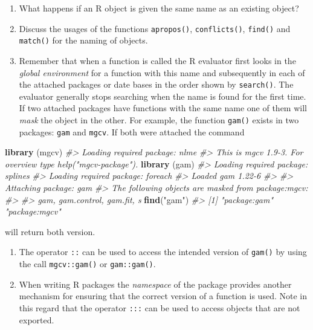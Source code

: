 \documentclass[
]{book}
\newenvironment{Shaded}{\begin{snugshade}}{\end{snugshade}}
\newcommand{\CommentTok}[1]{\textcolor[rgb]{0.56,0.35,0.01}{\textit{#1}}}
\newcommand{\FunctionTok}[1]{\textcolor[rgb]{0.13,0.29,0.53}{\textbf{#1}}}
\newcommand{\NormalTok}[1]{#1}
\newcommand{\StringTok}[1]{\textcolor[rgb]{0.31,0.60,0.02}{#1}}
\begin{document}
\begin{enumerate}
\def\labelenumi{(\alph{enumi})}
\item
  What happens if an R object is given the same name as an existing object?
\item
  Discuss the usages of the functions \texttt{apropos()}, \texttt{conflicts()}, \texttt{find()} and \texttt{match()} for the naming of objects.
\item
  Remember that when a function is called the R evaluator first looks in the \emph{{global environment}} for a function with this name and subsequently in each of the attached packages or date bases in the order shown by \texttt{search()}. The evaluator generally stops searching when the name is found for the first time. If two attached packages have functions with the same name one of them will \emph{{mask}} the object in the other. For example, the function \texttt{gam()} exists in two packages: \texttt{gam} and \texttt{mgcv}. If both were attached the command
\end{enumerate}

\begin{Shaded}
\begin{Highlighting}[]
\FunctionTok{library}\NormalTok{ (mgcv)}
\CommentTok{\#\textgreater{} Loading required package: nlme}
\CommentTok{\#\textgreater{} This is mgcv 1.9{-}3. For overview type \textquotesingle{}help("mgcv{-}package")\textquotesingle{}.}
\FunctionTok{library}\NormalTok{ (gam)}
\CommentTok{\#\textgreater{} Loading required package: splines}
\CommentTok{\#\textgreater{} Loading required package: foreach}
\CommentTok{\#\textgreater{} Loaded gam 1.22{-}6}
\CommentTok{\#\textgreater{} }
\CommentTok{\#\textgreater{} Attaching package: \textquotesingle{}gam\textquotesingle{}}
\CommentTok{\#\textgreater{} The following objects are masked from \textquotesingle{}package:mgcv\textquotesingle{}:}
\CommentTok{\#\textgreater{} }
\CommentTok{\#\textgreater{}     gam, gam.control, gam.fit, s}
\FunctionTok{find}\NormalTok{(}\StringTok{"gam"}\NormalTok{)}
\CommentTok{\#\textgreater{} [1] "package:gam"  "package:mgcv"}
\end{Highlighting}
\end{Shaded}

will return both version.

\begin{enumerate}
\def\labelenumi{(\alph{enumi})}
\setcounter{enumi}{3}
\item
  The operator \texttt{::} can be used to access the intended version of \texttt{gam()} by using the call \texttt{mgcv::gam()} or \texttt{gam::gam()}.
\item
  When writing R packages the \emph{{namespace}} of the package provides another mechanism for ensuring that the correct version of a function is used. Note in this regard that the operator \texttt{:::} can be used to access objects that are not exported.
\end{enumerate}
\end{document}

